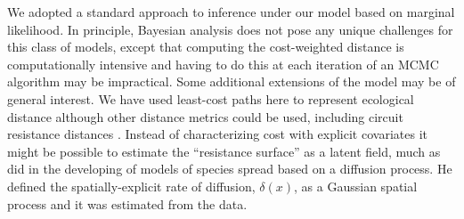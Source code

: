 \documentclass[12pt]{article}
\begin{document}
\begin{spacing}{1.8}
We adopted a standard approach to inference under our model based on
marginal likelihood. In principle,
Bayesian analysis does not pose any unique challenges for this
class of models, except that computing the cost-weighted distance is
computationally intensive and having to do this at each iteration of
an MCMC algorithm may be impractical.
Some additional extensions of the model may be of general interest.
We have used least-cost paths here to represent ecological distance
although other distance metrics could be used, including circuit
resistance distances \citep{mcrae:2006}.
Instead of
characterizing cost with explicit covariates it might be possible to
estimate the ``resistance surface'' as a latent field, much as
\citep{wikle:2003} did in the developing of models of species spread
based on a diffusion process. He defined the spatially-explicit rate
of diffusion, $\delta(x)$, as a Gaussian spatial process and it was
estimated from the data.









\newpage





\end{spacing}



\clearpage

\newpage
\end{document}
